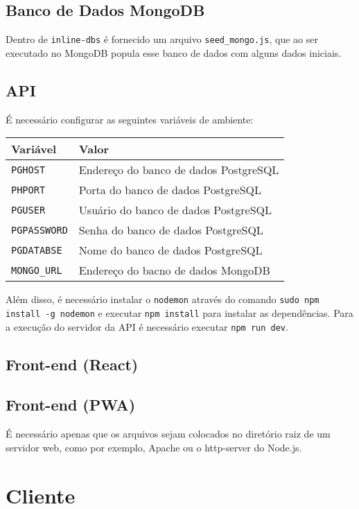 \documentclass{book}
\begin{document}
\subsection{Banco de Dados MongoDB}

Dentro de \verb|inline-dbs| é fornecido um arquivo \verb|seed_mongo.js|, que ao
ser executado no MongoDB popula esse banco de dados com alguns dados iniciais.

\subsection{API}
É necessário configurar as seguintes variáveis de ambiente:

\begin{tabular}{|l|l|}
\hline
Variável & Valor \\
\hline
\verb|PGHOST| & Endereço do banco de dados PostgreSQL \\
\hline
\verb|PHPORT| & Porta do banco de dados PostgreSQL \\
\hline
\verb|PGUSER| & Usuário do banco de dados PostgreSQL \\
\hline
\verb|PGPASSWORD| & Senha do banco de dados PostgreSQL \\
\hline
\verb|PGDATABSE| & Nome do banco de dados PostgreSQL \\
\hline
\verb|MONGO_URL| & Endereço do bacno de dados MongoDB \\
\hline
\end{tabular}

Além disso, é necessário instalar o \verb|nodemon| através do comando
\verb|sudo npm install -g nodemon| e executar \verb|npm install| para instalar
as dependências. Para a execução do servidor da API é necessário executar
\verb|npm run dev|.

\subsection{Front-end (React)}

\subsection{Front-end (PWA)}
É necessário apenas que os arquivos sejam colocados no diretório raiz de um
servidor web, como por exemplo, Apache ou o http-server do Node.js.

\section{Cliente}
\end{document}
